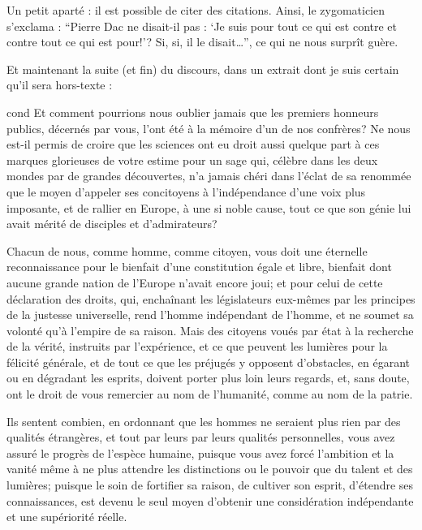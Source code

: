 \documentclass[12pt,space=onehalf,version=final]{yathesis}
\begin{document}
Un petit aparté : il est possible de citer des
citations. Ainsi, le zygomaticien
s'exclama : \enquote{Pierre Dac ne disait-il pas : \enquote{Je suis
    pour tout ce qui est contre et contre tout ce qui est pour!}?
  Si, si, il le disait\ldots{}}, ce qui ne nous surprît guère.

Et maintenant la suite (et fin) du discours, dans un extrait dont je
suis certain qu'il sera \og hors-texte\fg{} :
%
\begin{displaycquote}[pp.~509-511]{cond}
  Et comment pourrions nous oublier jamais que les premiers honneurs
  publics, décernés par vous, l'ont été à la mémoire d'un de nos
  confrères? Ne nous est-il permis de croire que les sciences ont eu
  droit aussi quelque part à ces marques glorieuses de votre estime
  pour un sage qui, célèbre dans les deux mondes par de grandes
  découvertes, n'a jamais chéri dans l'éclat de sa renommée que le
  moyen d'appeler ses concitoyens à l'indépendance d'une voix plus
  imposante, et de rallier en Europe, à une si noble cause, tout ce
  que son génie lui avait mérité de disciples et d'admirateurs?

  Chacun de nous, comme homme, comme citoyen, vous doit une éternelle
  reconnaissance pour le bienfait d'une constitution égale et libre,
  bienfait dont aucune grande nation de l'Europe n'avait encore joui;
  et pour celui de cette déclaration des droits, qui, enchaînant les
  législateurs eux-mêmes par les principes de la justesse universelle,
  rend l'homme indépendant de l'homme, et ne soumet sa volonté qu'à
  l'empire de sa raison.  Mais des citoyens voués par état à la
  recherche de la vérité, instruits par l'expérience, et ce que
  peuvent les lumières pour la félicité générale, et de tout ce que
  les préjugés y opposent d'obstacles, en égarant ou en dégradant les
  esprits, doivent porter plus loin leurs regards, et, sans doute, ont
  le droit de vous remercier au nom de l'humanité, comme au nom de la
  patrie.

  Ils sentent combien, en ordonnant que les hommes ne seraient plus
  rien par des qualités étrangères, et tout par leurs par leurs
  qualités personnelles, vous avez assuré le progrès de l'espèce
  humaine, puisque vous avez forcé l'ambition et la vanité même à ne
  plus attendre les distinctions ou le pouvoir que du talent et des
  lumières; puisque le soin de fortifier sa raison, de cultiver son
  esprit, d'étendre ses connaissances, est devenu le seul moyen
  d'obtenir une considération indépendante et une supériorité réelle.


\end{displaycquote}
\end{document}
